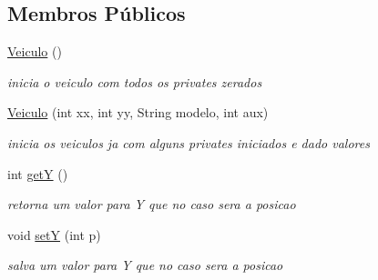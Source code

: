 \subsection*{Membros Públicos}
\begin{DoxyCompactItemize}
\item 
\mbox{\label{classcom_1_1company_1_1_veiculo_af90053fd848a2af693c83745ddf8e1b2}} 
\mbox{\hyperlink{classcom_1_1company_1_1_veiculo_af90053fd848a2af693c83745ddf8e1b2}{Veiculo}} ()
\begin{DoxyCompactList}\small\item\em inicia o veiculo com todos os privates zerados \end{DoxyCompactList}\item 
\mbox{\label{classcom_1_1company_1_1_veiculo_a41c4df426c7a44865a91805033a90c40}} 
\mbox{\hyperlink{classcom_1_1company_1_1_veiculo_a41c4df426c7a44865a91805033a90c40}{Veiculo}} (int xx, int yy, String modelo, int aux)
\begin{DoxyCompactList}\small\item\em inicia os veiculos ja com alguns privates iniciados e dado valores \end{DoxyCompactList}\item 
\mbox{\label{classcom_1_1company_1_1_veiculo_aaa9b728af0c768d45303cf571fb87aad}} 
int \mbox{\hyperlink{classcom_1_1company_1_1_veiculo_aaa9b728af0c768d45303cf571fb87aad}{getY}} ()
\begin{DoxyCompactList}\small\item\em retorna um valor para Y que no caso sera a posicao \end{DoxyCompactList}\item 
\mbox{\label{classcom_1_1company_1_1_veiculo_a9ada153473ad718329e574b9d8b08303}} 
void \mbox{\hyperlink{classcom_1_1company_1_1_veiculo_a9ada153473ad718329e574b9d8b08303}{setY}} (int p)
\begin{DoxyCompactList}\small\item\em salva um valor para Y que no caso sera a posicao \end{DoxyCompactList}\item 
\mbox{\label{classcom_1_1company_1_1_veiculo_a1dc4509f0773ea671941bddf79ae7711}} 

\end{DoxyCompactItemize}
